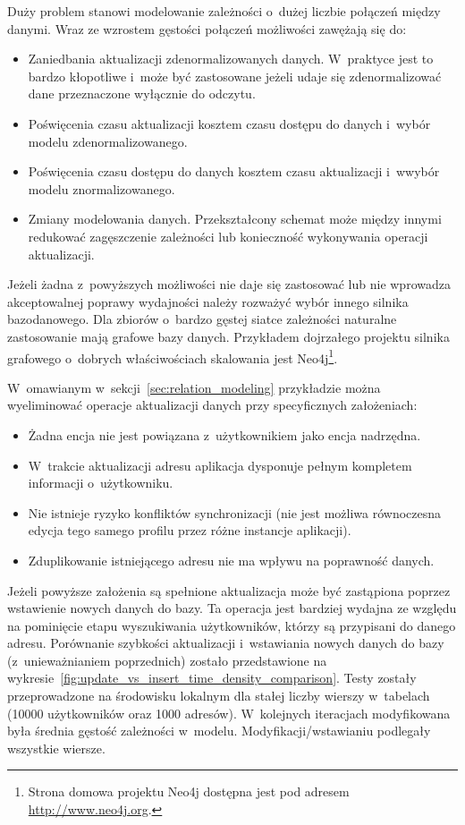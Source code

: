 Duży problem stanowi modelowanie zależności o~dużej liczbie połączeń między danymi. Wraz ze wzrostem gęstości połączeń możliwości zawężają się do:

\begin{itemize}
	\item Zaniedbania aktualizacji zdenormalizowanych danych. W~praktyce jest to bardzo kłopotliwe i~może być zastosowane jeżeli udaje się zdenormalizować dane przeznaczone wyłącznie do odczytu.
	\item Poświęcenia czasu aktualizacji kosztem czasu dostępu do danych i~wybór modelu zdenormalizowanego.
	\item Poświęcenia czasu dostępu do danych kosztem czasu aktualizacji i~wwybór modelu znormalizowanego.
	\item Zmiany modelowania danych. Przekształcony schemat może między innymi redukować zagęszczenie zależności lub konieczność wykonywania operacji aktualizacji.
\end{itemize}

Jeżeli żadna z~powyższych możliwości nie daje się zastosować lub nie wprowadza akceptowalnej poprawy wydajności należy rozważyć wybór innego silnika bazodanowego. Dla zbiorów o~bardzo gęstej siatce zależności naturalne zastosowanie mają grafowe bazy danych. Przykładem dojrzałego projektu silnika grafowego o~dobrych właściwościach skalowania jest Neo4j\footnote{Strona domowa projektu Neo4j dostępna jest pod adresem \url{http://www.neo4j.org}.}. 

W~omawianym w~sekcji~\ref{sec:relation_modeling} przykładzie można wyeliminować operacje aktualizacji danych przy specyficznych założeniach:

\begin{itemize}
	\item Żadna encja nie jest powiązana z~użytkownikiem jako encja nadrzędna.
	\item W~trakcie aktualizacji adresu aplikacja dysponuje pełnym kompletem informacji o~użytkowniku.
	\item Nie istnieje ryzyko konfliktów synchronizacji (nie jest możliwa równoczesna edycja tego samego profilu przez różne instancje aplikacji).
	\item Zduplikowanie istniejącego adresu nie ma wpływu na poprawność danych.
\end{itemize} 

Jeżeli powyższe założenia są spełnione aktualizacja może być zastąpiona poprzez wstawienie nowych danych do bazy. Ta operacja jest bardziej wydajna ze względu na pominięcie etapu wyszukiwania użytkowników, którzy są przypisani do danego adresu. Porównanie szybkości aktualizacji i~wstawiania nowych danych do bazy (z~unieważnianiem poprzednich) zostało przedstawione na wykresie~\ref{fig:update_vs_insert_time_density_comparison}. Testy zostały przeprowadzone na środowisku lokalnym dla stałej liczby wierszy w~tabelach (10000 użytkowników oraz 1000 adresów). W~kolejnych iteracjach modyfikowana była średnia gęstość zależności w~modelu. Modyfikacji/wstawianiu podlegały wszystkie wiersze.

